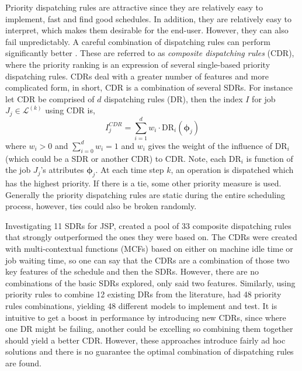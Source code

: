 \documentclass[smallextended]{svjour3}
\renewcommand{\vphi}{\bm{\phi}}
\begin{document}
Priority dispatching rules are attractive since they are relatively easy to implement, 
fast and find good schedules. In addition, they are relatively easy to 
interpret, which makes them desirable for the end-user.
However, they can also fail unpredictably. 
A careful combination of dispatching rules can perform significantly better 
\cite{Jayamohan04}. These are referred to as \emph{composite dispatching rules} 
(CDR), where the priority ranking is an expression of several single-based 
priority dispatching rules. CDRs deal with a greater number of features and 
more complicated form, in short, CDR is a combination of several SDRs. For 
instance let CDR be comprised of $d$ dispatching rules (DR), then the index $I$ 
for job $J_j\in\mathcal{L}^{(k)}$ using CDR is, 
\begin{equation}
	I_j^{CDR} = \sum_{i=1}^d w_i \cdot \text{DR}_i(\vphi_j) \label{eq:CDR}
\end{equation}
where $w_i>0$ and $\sum_{i=0}^d w_i = 1$ and $w_i$ gives the weight of the 
influence of $\text{DR}_i$ (which could be a SDR or another CDR) to CDR. Note, 
each $\text{DR}_i$ is function of the job $J_j$'s attributes $\vphi_j$.  
At each time step $k$, an operation is dispatched which has the highest 
priority.  If there is a 
tie, some other priority measure is used. Generally the priority dispatching 
rules are static during the entire scheduling process, however, ties could also be broken randomly. 




Investigating 11 SDRs for JSP, \cite{Lu13} created a pool of 33 composite 
dispatching rules that strongly outperformed the ones they were based on. 
The CDRs were created with multi-contextual functions (MCFs) 
based on either on machine idle time or job waiting time, so one can say that 
the CDRs are a combination of those two key features of the schedule and then 
the SDRs. However, there are no combinations of the basic SDRs explored, only 
said two features.  
Similarly, using priority rules to combine 12 existing DRs from the literature, 
\citet{Yu13} had 48 priority rules combinations, yielding 48 different models 
to implement and test. 
It is intuitive to get a boost in performance by introducing new CDRs, since 
where one DR might be failing, another could be excelling so combining them 
together should yield a better CDR. However, these approaches introduce fairly 
ad hoc solutions and there is no guarantee the optimal combination of 
dispatching rules are found.
\end{document}
